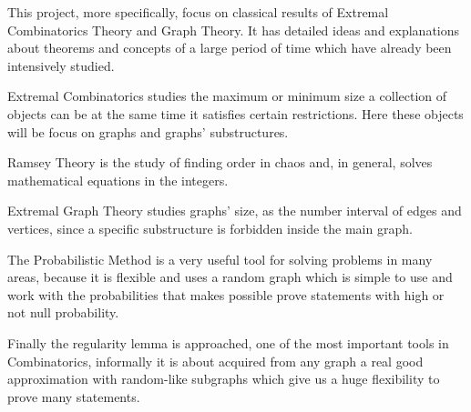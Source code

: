 \documentclass[12pt,twoside,a4paper]{book}
\numberwithin{equation}{section}
\theoremstyle{remark}
\begin{document}
This project, more specifically, focus on classical results of Extremal Combinatorics Theory and Graph Theory. It has detailed ideas and explanations about theorems and concepts of a large period of time which have already been intensively studied.

Extremal Combinatorics studies the maximum or minimum size a collection of objects can be at the same time it satisfies certain restrictions. Here these objects will be focus on graphs and graphs' substructures. 

Ramsey Theory is the study of finding order in chaos and, in general, solves mathematical equations in the integers.

Extremal Graph Theory studies graphs' size, as the number interval of edges and vertices, since a specific substructure is forbidden inside the main graph.

The Probabilistic Method is a very useful tool for solving problems in many areas, because it is flexible and uses a random graph which is simple to use and work with the probabilities that makes possible prove statements with high or not null probability.

Finally the regularity lemma is approached, one of the most important tools in Combinatorics, informally it is about acquired from any graph a real good approximation with random-like subgraphs which give us a huge flexibility to prove many statements.







\end{document}
